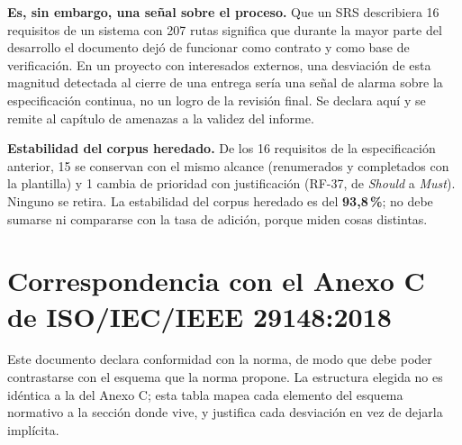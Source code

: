 \documentclass[11pt,a4paper]{article}
\begin{document}
\textbf{Es, sin embargo, una señal sobre el proceso.} Que un SRS describiera 16 requisitos de un
sistema con 207 rutas significa que durante la mayor parte del desarrollo el documento dejó de
funcionar como contrato y como base de verificación. En un proyecto con interesados externos,
una desviación de esta magnitud detectada al cierre de una entrega sería una señal de alarma
sobre la especificación continua, no un logro de la revisión final. Se declara aquí y se remite
al capítulo de amenazas a la validez del informe.

\textbf{Estabilidad del corpus heredado.} De los 16 requisitos de la especificación anterior, 15 se
conservan con el mismo alcance (renumerados y completados con la plantilla) y 1 cambia de
prioridad con justificación (RF-37, de \emph{Should} a \emph{Must}). Ninguno se retira. La
estabilidad del corpus heredado es del \textbf{93,8\,\%}; no debe sumarse ni compararse con la
tasa de adición, porque miden cosas distintas.

\section{Correspondencia con el Anexo C de ISO/IEC/IEEE 29148:2018}
\label{sec:anexoc}

Este documento declara conformidad con la norma, de modo que debe poder contrastarse con el
esquema que la norma propone. La estructura elegida no es idéntica a la del Anexo C; esta tabla
mapea cada elemento del esquema normativo a la sección donde vive, y justifica cada desviación
en vez de dejarla implícita.
\end{document}
